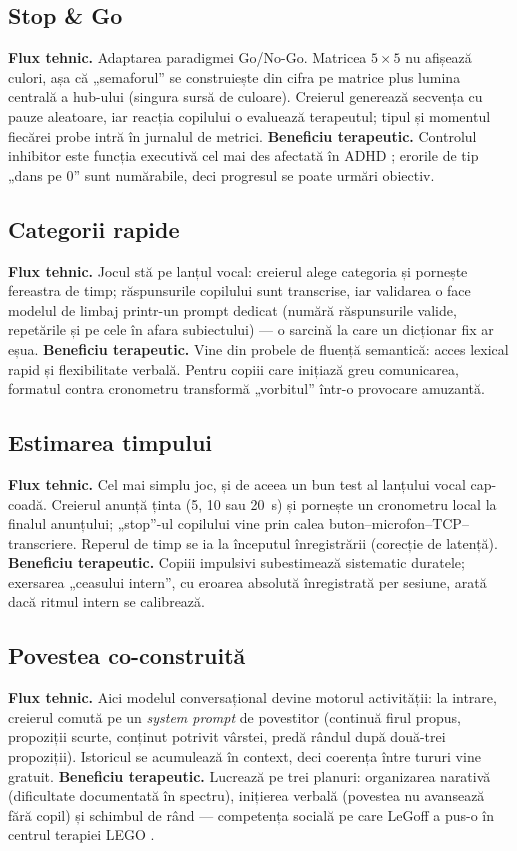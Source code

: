 \subsection*{Stop \& Go}
\textbf{Flux tehnic.} Adaptarea paradigmei Go/No-Go. Matricea $5\times5$ nu afișează culori, așa că „semaforul” se construiește din cifra pe matrice plus lumina centrală a hub-ului (singura sursă de culoare). Creierul generează secvența cu pauze aleatoare, iar reacția copilului o evaluează terapeutul; tipul și momentul fiecărei probe intră în jurnalul de metrici.
\textbf{Beneficiu terapeutic.} Controlul inhibitor este funcția executivă cel mai des afectată în ADHD \cite{diamond2013}; erorile de tip „dans pe 0” sunt numărabile, deci progresul se poate urmări obiectiv.

\subsection*{Categorii rapide}
\textbf{Flux tehnic.} Jocul stă pe lanțul vocal: creierul alege categoria și pornește fereastra de timp; răspunsurile copilului sunt transcrise, iar validarea o face modelul de limbaj printr-un prompt dedicat (numără răspunsurile valide, repetările și pe cele în afara subiectului) — o sarcină la care un dicționar fix ar eșua.
\textbf{Beneficiu terapeutic.} Vine din probele de fluență semantică: acces lexical rapid și flexibilitate verbală. Pentru copiii care inițiază greu comunicarea, formatul contra cronometru transformă „vorbitul” într-o provocare amuzantă.

\subsection*{Estimarea timpului}
\textbf{Flux tehnic.} Cel mai simplu joc, și de aceea un bun test al lanțului vocal cap-coadă. Creierul anunță ținta (5, 10 sau 20~s) și pornește un cronometru local la finalul anunțului; „stop”-ul copilului vine prin calea buton--microfon--TCP--transcriere. Reperul de timp se ia la începutul înregistrării (corecție de latență).
\textbf{Beneficiu terapeutic.} Copiii impulsivi subestimează sistematic duratele; exersarea „ceasului intern”, cu eroarea absolută înregistrată per sesiune, arată dacă ritmul intern se calibrează.

\subsection*{Povestea co-construită}
\textbf{Flux tehnic.} Aici modelul conversațional devine motorul activității: la intrare, creierul comută pe un \emph{system prompt} de povestitor (continuă firul propus, propoziții scurte, conținut potrivit vârstei, predă rândul după două-trei propoziții). Istoricul se acumulează în context, deci coerența între tururi vine gratuit.
\textbf{Beneficiu terapeutic.} Lucrează pe trei planuri: organizarea narativă (dificultate documentată în spectru), inițierea verbală (povestea nu avansează fără copil) și schimbul de rând — competența socială pe care LeGoff a pus-o în centrul terapiei LEGO \cite{legoff2004}.

